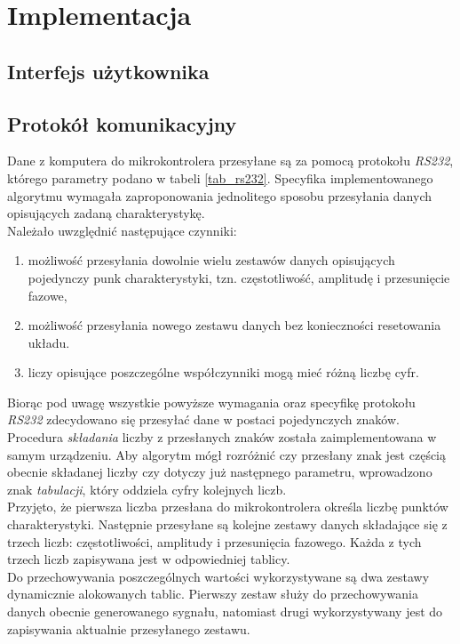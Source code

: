 \section{Implementacja}
\subsection{Interfejs użytkownika}

\subsection{Protokół komunikacyjny}

Dane z komputera do mikrokontrolera przesyłane są za pomocą protokołu \textit{RS232}, którego parametry podano w tabeli \ref{tab_rs232}. Specyfika implementowanego algorytmu wymagała zaproponowania jednolitego sposobu przesyłania danych opisujących zadaną charakterystykę. \\
Należało uwzględnić następujące czynniki:
\begin{enumerate}
	
	\item możliwość przesyłania dowolnie wielu zestawów danych opisujących pojedynczy punk charakterystyki, tzn. częstotliwość, amplitudę i przesunięcie fazowe,
	\item możliwość przesyłania nowego zestawu danych bez konieczności resetowania układu.
	\item liczy opisujące poszczególne współczynniki mogą mieć różną liczbę cyfr.
\end{enumerate}
%
%
Biorąc pod uwagę wszystkie powyższe wymagania oraz specyfikę protokołu \textit{RS232} zdecydowano się przesyłać dane w postaci pojedynczych znaków. Procedura \textit{składania} liczby z przesłanych znaków została zaimplementowana w samym urządzeniu. Aby algorytm mógł rozróżnić czy przesłany znak jest częścią obecnie składanej liczby czy dotyczy już następnego parametru, wprowadzono znak \textit{tabulacji}, który oddziela cyfry kolejnych liczb.
\\
Przyjęto, że pierwsza liczba przesłana do mikrokontrolera określa liczbę punktów charakterystyki. Następnie przesyłane są kolejne zestawy danych składające się z trzech liczb: częstotliwości, amplitudy i przesunięcia fazowego. Każda z tych trzech liczb zapisywana jest w odpowiedniej tablicy.
\\
Do przechowywania poszczególnych wartości wykorzystywane są dwa zestawy dynamicznie alokowanych tablic. Pierwszy zestaw służy do przechowywania danych obecnie generowanego sygnału, natomiast drugi wykorzystywany jest do zapisywania aktualnie przesyłanego zestawu. 
